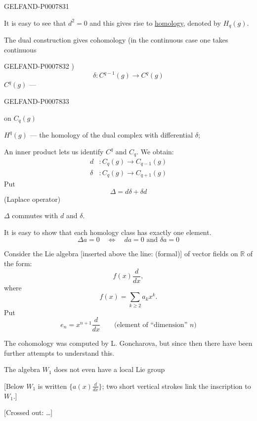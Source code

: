 \begin{GelfandAdjacentEvidence}{GELFAND-P000783}{1}

It is easy to see that \(d^2=0\) and this gives rise to \underline{homology},
denoted by \(H_q(g)\).

The dual construction gives cohomology (in the continuous case one takes continuous
\end{GelfandAdjacentEvidence}
\begin{GelfandAdjacentEvidence}{GELFAND-P000783}{2}
)
\begin{equation}
\delta:C^{q-1}(g)\longrightarrow C^q(g)\tag{2}
\end{equation}
\(C^q(g)\) ---
\end{GelfandAdjacentEvidence}
\begin{GelfandAdjacentEvidence}{GELFAND-P000783}{3}

on \(C_q(g)\)

\(H^q(g)\) --- the homology of the dual complex with differential \(\delta\);

An inner product lets us identify \(C^q\) and \(C_q\). We obtain:
\begin{align*}
d &: C_q(g)\longrightarrow C_{q-1}(g)\\
\delta &: C_q(g)\longrightarrow C_{q+1}(g)
\end{align*}
Put
\begin{equation}
\Delta=d\delta+\delta d\tag{3}
\end{equation}
(Laplace operator)

\(\Delta\) commutes with \(d\) and \(\delta\).

It is easy to show that each homology class has exactly one  element.
\begin{equation}
\Delta a=0\quad\Longleftrightarrow\quad da=0\text{ and }\delta a=0\tag{4}
\end{equation}

Consider the Lie algebra [inserted above the line: (formal)] of vector fields on \(\mathbb R\) of the form:
\begin{equation}
f(x)\frac{d}{dx},\tag{5}
\end{equation}
where
\begin{equation}
f(x)=\sum_{k\geq2}a_kx^k.\tag{6}
\end{equation}
Put
\[
e_n=x^{n+1}\frac{d}{dx}
\qquad\text{(element of “dimension” \(n\))}
\]

The cohomology was computed by L. Goncharova, but since then there have been further attempts to understand this.

The algebra \(W_1\) does not even have a local Lie group

[Below \(W_1\) is written \(\{a(x)\tfrac{d}{dx}\}\);
two short vertical strokes link the inscription to \(W_1\).]

[Crossed out: …]
\end{GelfandAdjacentEvidence}
